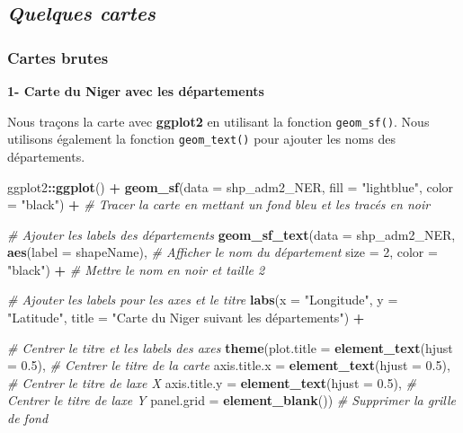 \documentclass[
]{article}
\newenvironment{Shaded}{\begin{snugshade}}{\end{snugshade}}
\newcommand{\AttributeTok}[1]{\textcolor[rgb]{0.13,0.29,0.53}{#1}}
\newcommand{\CommentTok}[1]{\textcolor[rgb]{0.56,0.35,0.01}{\textit{#1}}}
\newcommand{\DecValTok}[1]{\textcolor[rgb]{0.00,0.00,0.81}{#1}}
\newcommand{\FloatTok}[1]{\textcolor[rgb]{0.00,0.00,0.81}{#1}}
\newcommand{\FunctionTok}[1]{\textcolor[rgb]{0.13,0.29,0.53}{\textbf{#1}}}
\newcommand{\NormalTok}[1]{#1}
\newcommand{\SpecialCharTok}[1]{\textcolor[rgb]{0.81,0.36,0.00}{\textbf{#1}}}
\newcommand{\StringTok}[1]{\textcolor[rgb]{0.31,0.60,0.02}{#1}}
\begin{document}
\subsection{\texorpdfstring{\emph{Quelques
cartes}}{Quelques cartes}}\label{quelques-cartes-1}

\subsubsection{Cartes brutes}\label{cartes-brutes-1}

\textbf{1- Carte du Niger avec les départements}

Nous traçons la carte avec \textbf{ggplot2} en utilisant la fonction
\texttt{geom\_sf()}. Nous utilisons également la fonction
\texttt{geom\_text()} pour ajouter les noms des départements.

\begin{Shaded}
\begin{Highlighting}[]
\NormalTok{ggplot2}\SpecialCharTok{::}\FunctionTok{ggplot}\NormalTok{() }\SpecialCharTok{+}
  \FunctionTok{geom\_sf}\NormalTok{(}\AttributeTok{data =}\NormalTok{ shp\_adm2\_NER, }\AttributeTok{fill =} \StringTok{"lightblue"}\NormalTok{, }\AttributeTok{color =} \StringTok{"black"}\NormalTok{) }\SpecialCharTok{+} \CommentTok{\# Tracer la carte en mettant un fond bleu et les tracés en noir}
  
  \CommentTok{\# Ajouter les labels des départements }
  \FunctionTok{geom\_sf\_text}\NormalTok{(}\AttributeTok{data =}\NormalTok{ shp\_adm2\_NER, }
               \FunctionTok{aes}\NormalTok{(}\AttributeTok{label =}\NormalTok{ shapeName), }\CommentTok{\# Afficher le nom du département }
               \AttributeTok{size =} \DecValTok{2}\NormalTok{, }\AttributeTok{color =} \StringTok{"black"}\NormalTok{) }\SpecialCharTok{+}  \CommentTok{\# Mettre le nom en noir et taille 2}
  
  \CommentTok{\# Ajouter les labels pour les axes et le titre}
  \FunctionTok{labs}\NormalTok{(}\AttributeTok{x =} \StringTok{"Longitude"}\NormalTok{, }\AttributeTok{y =} \StringTok{"Latitude"}\NormalTok{, }\AttributeTok{title =} \StringTok{"Carte du Niger suivant les départements"}\NormalTok{) }\SpecialCharTok{+}  
  
  \CommentTok{\# Centrer le titre et les labels des axes}
  \FunctionTok{theme}\NormalTok{(}\AttributeTok{plot.title =} \FunctionTok{element\_text}\NormalTok{(}\AttributeTok{hjust =} \FloatTok{0.5}\NormalTok{),  }\CommentTok{\# Centrer le titre de la carte}
        \AttributeTok{axis.title.x =} \FunctionTok{element\_text}\NormalTok{(}\AttributeTok{hjust =} \FloatTok{0.5}\NormalTok{),  }\CommentTok{\# Centrer le titre de l\textquotesingle{}axe X}
        \AttributeTok{axis.title.y =} \FunctionTok{element\_text}\NormalTok{(}\AttributeTok{hjust =} \FloatTok{0.5}\NormalTok{),  }\CommentTok{\# Centrer le titre de l\textquotesingle{}axe Y}
        \AttributeTok{panel.grid =} \FunctionTok{element\_blank}\NormalTok{())  }\CommentTok{\# Supprimer la grille de fond}
\end{Highlighting}
\end{Shaded}
\end{document}
